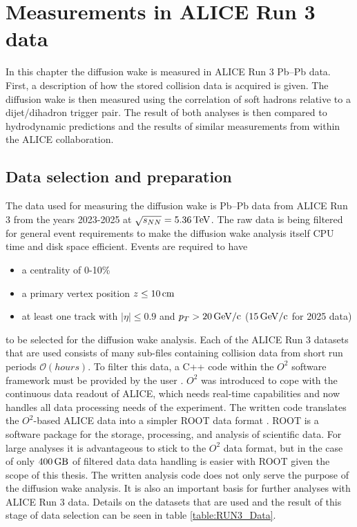 \documentclass[
  a4paper,
  12pt,
  oneside,
  parskip=half,
  listof=totoc,
  bibliography=totoc,
  DIV=12,
  numbers=noenddot,
  BA.tex
  ]{subfiles}
\begin{document}
\section{Measurements in ALICE Run 3 data}

In this chapter the diffusion wake is measured in ALICE Run 3 Pb--Pb data. First, a description of how the stored collision data is acquired is given. The diffusion wake is then measured using the correlation of soft hadrons relative to a dijet/dihadron trigger pair. The result of both analyses is then compared to hydrodynamic predictions and the results of similar measurements from within the ALICE collaboration.

\subsection{Data selection and preparation}

The data used for measuring the diffusion wake is Pb--Pb data from ALICE Run 3 from the years 2023-2025 at $\sqrt{s_{NN}} = 5.36\bunit{TeV}$. The raw data is being filtered for general event requirements to make the diffusion wake analysis itself CPU time and disk space efficient. Events are required to have

\begin{itemize}
	\item a centrality of 0-10\%
	\item a primary vertex position $z \leq 10\bunit{cm}$
	\item at least one track with $|\eta| \leq 0.9$ and $p_T > 20\bunit{GeV/c}$ ($15\bunit{GeV/c}$ for 2025 data)
\end{itemize}

to be selected for the diffusion wake analysis. Each of the ALICE Run 3 datasets that are used consists of many sub-files containing collision data from short run periods $\mathcal{O}(hours)$. To filter this data, a C++ code within the $O^2$ software framework must be provided by the user \cite{eulisse_o2_2024}. $O^2$ was introduced to cope with the continuous data readout of ALICE, which needs real-time capabilities and now handles all data processing needs of the experiment. The written code translates the $O^2$-based ALICE data into a simpler ROOT data format \cite{brun_root_1997}. ROOT is a software package for the storage, processing, and analysis of scientific data. For large analyses it is advantageous to stick to the $O^2$ data format, but in the case of only $400\bunit{GB}$ of filtered data data handling is easier with ROOT given the scope of this thesis. The written analysis code does not only serve the purpose of the diffusion wake analysis. It is also an important basis for further analyses with ALICE Run 3 data. Details on the datasets that are used and the result of this stage of data selection can be seen in table \ref{table:RUN3_Data}.
\end{document}
